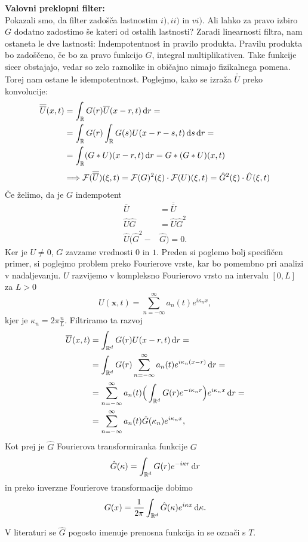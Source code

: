 \documentclass[mat2, tisk]{fmfdelo}
\newcommand{\R}{\mathbb R}
\newcommand{\bd}{\textbf}
\begin{document}
\noindent
\textbf{Valovni preklopni filter:} \\
Pokazali smo, da filter zadošča lastnostim $i), ii)$ in $vi)$. Ali lahko za pravo izbiro 
$G$ dodatno zadostimo še kateri od ostalih lastnosti? Zaradi linearnosti filtra, nam 
ostaneta le dve lastnosti: Indempotentnost in pravilo produkta. Pravilu produkta bo
zadoščeno, če bo za pravo funkcijo $G$, integral multiplikativen. Take funkcije sicer 
obstajajo, vedar so zelo raznolike in običajno nimajo fizikalnega pomena. Torej nam ostane 
le idempotentnost. Poglejmo, kako se izraža $\overline{\overline{{U}}}$ preko konvolucije:
\begin{align*}
\overline{\overline{{U}}}(x, t) &= \int_{\R} G(r) \overline{{U}}(x - r, t) \dif r = \\
&= \int_{\R} G(r) \int_{\R} G(s) {U}(x-r-s, t) \dif s \dif r = \\
&= \int_{\R} (G*{U})(x - r, t) \dif r = G*(G * {U})(x, t) \\[1mm]
&\Longrightarrow \mathcal{F}(\overline{\overline{{U}}})(\xi, t) = \mathcal{F}(G)^2(\xi)\cdot\mathcal{F}({U})(\xi, t) = \hat{G}^2(\xi) \cdot \hat{{U}}(\xi, t)
\end{align*}
Če želimo, da je $G$ indempotent
\begin{align*}
\overline{{U}} &= \overline{\overline{{U}}} \\
\hat{{U}}\hat{G} &= \hat{{U}}\hat{G}^2 \\ 
\hat{U}(\hat{G}^2 - &\hat{G}) = 0.
\end{align*}
Ker je $U \neq 0$, $G$ zavzame vrednosti $0$ in $1$. Preden si poglemo bolj specifičen primer, 
si poglejmo problem preko Fourierove vrste, kar bo pomembno pri analizi v nadaljevanju.
${U}$ razvijemo v kompleksno Fourierovo vrsto na intervalu $[0, L]$ za $L > 0$
\begin{equation}
{U}(\bd{x}, t) = \sum_{n=-\infty}^\infty a_n(t) e^{i\kappa_n x},
\end{equation}
kjer je $\kappa_n = 2\pi\frac{n}{L}$. Filtriramo ta razvoj 
\begin{align*}
\overline{U}(x, t) &= \int_{\R^d} G(r) U(x - r, t) \dif r = \\
&= \int_{\R^d} G(r) \sum_{n=-\infty}^\infty a_n(t) e^{i\kappa_n (x - r)} \dif r = \\
&= \sum_{n=-\infty}^\infty a_n(t)\Big(\int_{\R^d} G(r) e^{-i\kappa_n r}\Big) e^{i\kappa_n x}\dif r = \\
&= \sum_{n=-\infty}^\infty a_n(t) \hat{G}(\kappa_n) e^{i\kappa_n x},
\end{align*}
Kot prej je $\hat{G}$ Fourierova transformiranka funkcije $G$ 
$$
\hat{G}(\kappa) = \int_{\R^d} G(r) e^{-i\kappa r} \dif r
$$
in preko inverzne Fourierove transformacije dobimo
$$
G(x) = \frac{1}{2\pi} \int_{\R^d} \hat{G}(\kappa) e^{i\kappa x} \dif \kappa.
$$
\begin{opomba}
V literaturi se $\hat{G}$ pogosto imenuje prenosna funkcija in se označi s $T$.
\end{opomba}
\end{document}
